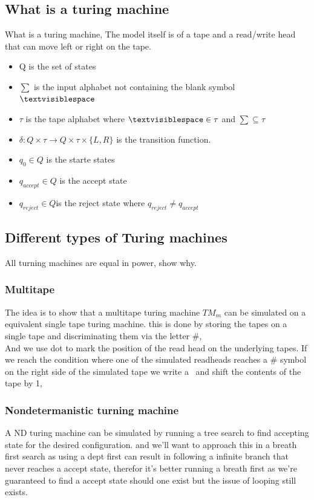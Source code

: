 \documentclass[a4paper,10pt,titlepage]{report}
\begin{document}
\subsection{What is a turing machine}
    What is a turing machine, The model itself is of a tape and a read/write head that can move left or right on the tape.\\
\begin{itemize}
\item Q is the set of states
\item $\sum$ is the input alphabet not containing the blank symbol $\textvisiblespace$
\item $\tau$ is the tape alphabet where  $\textvisiblespace \in \tau$ and $\sum \subseteq \tau $
\item  $\delta: Q \times \tau \rightarrow Q \times \tau \times \{L,R\} $ is the transition function.
\item $q_0 \in Q$ is the starte states
\item $q_{accept} \in Q$ is the accept state
\item $q_{reject} \in Q $is the reject state where $q_{reject} \neq q_{accept}$ 
\end{itemize}
    

\subsection{Different types of Turing machines}
All turning machines are equal in power, show why.
\subsubsection{Multitape}

The idea is to show that a multitape turing machine $TM_m$ can be simulated on a equivalent single tape turing machine. this is done by storing the tapes on a single tape and discriminating them via the letter $\#$, \\

And we use dot to mark the position of the read head on the underlying tapes. 
If we reach the condition where one of the simulated readheads reaches a $ \# $ symbol on the right side of the simulated tape we write a \textvisiblespace \ and shift the contents of the tape by 1,  
\subsubsection{Nondetermanistic turning machine}
A ND turing machine can be simulated by running a tree search to find accepting state for the desired configuration. and we'll want to approach this in a breath first search as using a dept first can result in following a infinite branch that never reaches a accept state, therefor it's better running a breath first as we're guaranteed to find a accept state should one exist but the issue of looping still exists.
\end{document}
